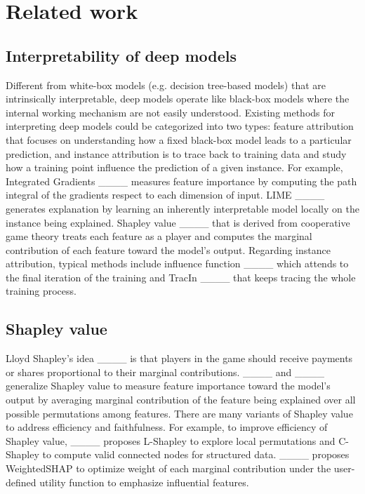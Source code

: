 \section{Related work}
\subsection{Interpretability of deep models}

Different from white-box models (e.g. decision tree-based models) that are intrinsically interpretable, deep models operate like black-box models where the internal working mechanism are not easily understood. Existing methods for interpreting deep models could be categorized into two types: feature attribution that focuses on understanding how a fixed black-box model leads to a particular prediction, and instance attribution is to trace back to training data and study how a training point influence the prediction of a given instance. For example, Integrated Gradients ____ measures feature importance by computing the path integral of the gradients respect to each dimension of input. LIME ____ generates explanation by learning an inherently interpretable model locally on the instance being explained. Shapley value ____ that is derived from cooperative game theory treats each feature as a player and computes the marginal contribution of each feature toward the model's output. Regarding instance attribution, typical methods include influence function ____ which attends to the final iteration of the training and TracIn ____ that keeps tracing the whole training process.

\subsection{Shapley value}

Lloyd Shapley’s idea ____ is that players in the game should receive payments or shares proportional to their marginal contributions. ____ and ____ generalize Shapley value to measure feature importance toward the model's output by averaging marginal contribution of the feature being explained over all possible permutations among features. There are many variants of Shapley value to address efficiency and faithfulness. For example, to improve efficiency of Shapley value, ____ proposes L-Shapley to explore local permutations and C-Shapley to compute valid connected nodes for structured data. ____ proposes WeightedSHAP to optimize weight of each marginal contribution under the user-defined utility function to emphasize influential features. 

